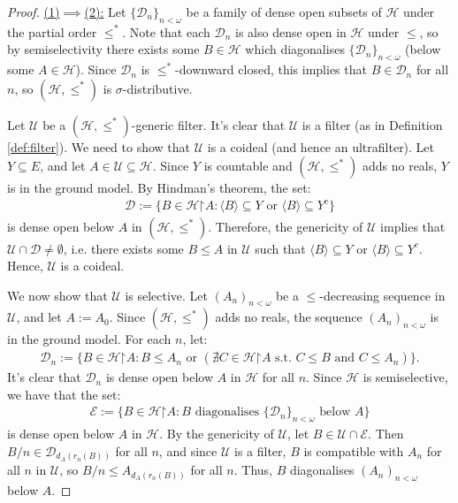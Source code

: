 \documentclass[11pt,reqno]{amsart}
\theoremstyle{plain}
\numberwithin{equation}{section}
\theoremstyle{definition}
\renewcommand{\c}[1]{\langle #1 \rangle}
\newcommand{\cal}{\mathcal}
\newcommand{\restrictedto}{\mathord{\upharpoonright}}
\newcommand{\U}{\cal{U}}
\renewcommand{\H}{\cal{H}}
\newcommand{\D}{\cal{D}}
\newcommand{\E}{\cal{E}}
\begin{document}
\begin{proof}
    \underline{(1)$\implies$(2):} Let $\{\D_n\}_{n<\omega}$ be a family of dense open subsets of $\H$ under the partial order $\leq^*$. Note that each $\D_n$ is also dense open in $\H$ under $\leq$, so by semiselectivity there exists some $B \in \H$ which diagonalises $\{\D_n\}_{n<\omega}$ (below some $A \in \H$). Since $\D_n$ is $\leq^*$-downward closed, this implies that $B \in \D_n$ for all $n$, so $(\H,\leq^*)$ is $\sigma$-distributive.

    Let $\U$ be a $(\H,\leq^*)$-generic filter. It's clear that $\U$ is a filter (as in Definition \ref{def:filter}). We need to show that $\U$ is a coideal (and hence an ultrafilter). Let $Y \subseteq E$, and let $A \in \U \subseteq \H$. Since $Y$ is countable and $(\H,\leq^*)$ adds no reals, $Y$ is in the ground model. By Hindman's theorem, the set:
    \begin{align*}
        \D := \{B \in \H\restrictedto A : \c{B} \subseteq Y \text{ or } \c{B} \subseteq Y^c\}
    \end{align*}
    is dense open below $A$ in $(\H,\leq^*)$. Therefore, the genericity of $\U$ implies that $\U \cap \D \neq \emptyset$, i.e. there exists some $B \leq A$ in $\U$ such that $\c{B} \subseteq Y$ or $\c{B} \subseteq Y^c$. Hence, $\U$ is a coideal.

    We now show that $\U$ is selective. Let $(A_n)_{n<\omega}$ be a $\leq$-decreasing sequence in $\U$, and let $A := A_0$. Since $(\H,\leq^*)$ adds no reals, the sequence $(A_n)_{n<\omega}$ is in the ground model. For each $n$, let:
    \begin{align*}
        \D_n := \{B \in \H\restrictedto A : B \leq A_n \text{ or } (\nexists C \in \H\restrictedto A \text{ s.t. } C \leq B \text{ and } C \leq A_n)\}.
    \end{align*}
    It's clear that $\D_n$ is dense open below $A$ in $\H$ for all $n$. Since $\H$ is semiselective, we have that the set:
    \begin{align*}
        \E := \{B \in \H\restrictedto A : \text{$B$ diagonalises $\{\D_n\}_{n<\omega}$ below $A$}\}
    \end{align*}
    is dense open below $A$ in $\H$. By the genericity of $\U$, let $B \in \U \cap \E$. Then $B/n \in \D_{d_A(r_n(B))}$ for all $n$, and since $\U$ is a filter, $B$ is compatible with $A_n$ for all $n$ in $\U$, so $B/n \leq A_{d_A(r_n(B))}$ for all $n$. Thus, $B$ diagonalises $(A_n)_{n<\omega}$ below $A$.


\end{proof}
\end{document}
